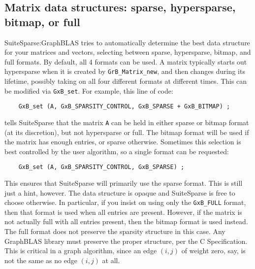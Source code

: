 \documentclass[12pt]{article}
\begin{document}
{%
\subsection{Matrix data structures: sparse, hypersparse, bitmap, or full}

SuiteSparse:GraphBLAS tries to automatically determine the best data structure
for your matrices and vectors, selecting between sparse, hypersparse, bitmap,
and full formats.  By default, all 4 formats can be used.  A matrix typically
starts out hypersparse when it is created by \verb'GrB_Matrix_new', and then
changes during its lifetime, possibly taking on all four different formats
at different times.  This can be modified via \verb'GxB_set'.  For example,
this line of code:

    {\scriptsize
    \begin{verbatim}
    GxB_set (A, GxB_SPARSITY_CONTROL, GxB_SPARSE + GxB_BITMAP) ; \end{verbatim}}

\noindent
tells SuiteSparse that the matrix \verb'A' can be held in either sparse or
bitmap format (at its discretion), but not hypersparse or full.  The bitmap
format will be used if the matrix has enough entries, or sparse otherwise.
Sometimes this selection is best controlled by the user algorithm, so a single
format can be requested:

    {\scriptsize
    \begin{verbatim}
    GxB_set (A, GxB_SPARSITY_CONTROL, GxB_SPARSE) ; \end{verbatim}}

This ensures that SuiteSparse will primarily use the sparse format.  This is
still just a hint, however.  The data structure is opaque and SuiteSparse is
free to choose otherwise.  In particular, if you insist on using only the
\verb'GxB_FULL' format, then that format is used when all entries are present.
However, if the matrix is not actually full with all entries present, then the
bitmap format is used instead.  The full format does not preserve the sparsity
structure in this case.  Any GraphBLAS library must preserve the proper
structure, per the C Specification.  This is critical in a graph algorithm,
since an edge $(i,j)$ of weight zero, say, is not the same as no edge $(i,j)$
at all.

}
\end{document}

